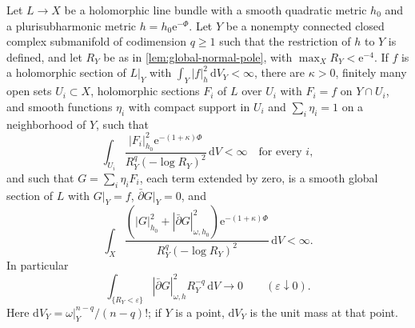 \begin{lemma}\label{lem:critical-gain-initial-gluing}
Let $L\to X$ be a holomorphic line bundle with a smooth quadratic metric $h_0$ and a plurisubharmonic metric $h=h_0\mathrm e^{-\Phi}$. Let $Y$ be a nonempty connected closed complex submanifold of codimension $q\geq1$ such that the restriction of $h$ to $Y$ is defined, and let $R_Y$ be as in \cref{lem:global-normal-pole}, with $\max_XR_Y<\mathrm e^{-4}$. If $f$ is a holomorphic section of $L|_Y$ with $\int_Y|f|_h^2\,\mathrm dV_Y<\infty$, there are $\kappa>0$, finitely many open sets $U_i\subset X$, holomorphic sections $F_i$ of $L$ over $U_i$ with $F_i=f$ on $Y\cap U_i$, and smooth functions $\eta_i$ with compact support in $U_i$ and $\sum_i\eta_i=1$ on a neighborhood of $Y$, such that
\begin{equation}\label{eq:critical-local-extension-gain}
 \int_{U_i}\frac{|F_i|_{h_0}^2\mathrm e^{-(1+\kappa)\Phi}}{R_Y^q(-\log R_Y)^2}\,\mathrm dV<\infty\quad\text{for every }i,
\end{equation}
and such that $G=\sum_i\eta_iF_i$, each term extended by zero, is a smooth global section of $L$ with $G|_Y=f$, $\bar\partial G|_Y=0$, and
\begin{equation}\label{eq:strengthened-critical-initial-norm}
 \int_X\frac{(|G|_{h_0}^2+|\bar\partial G|_{\omega,h_0}^2)
                         \mathrm e^{-(1+\kappa)\Phi}}
                    {R_Y^q(-\log R_Y)^2}\,\mathrm dV<\infty.
\end{equation}
In particular
\begin{equation}\label{eq:critical-gluing-error-decay}
 \int_{\{R_Y<\varepsilon\}}|\bar\partial G|_{\omega,h}^2R_Y^{-q}\,\mathrm dV
                  \longrightarrow0\qquad(\varepsilon\downarrow0).
\end{equation}
Here $\mathrm dV_Y=\omega|_Y^{n-q}/(n-q)!$; if $Y$ is a point, $\mathrm dV_Y$ is the unit mass at that point.
\end{lemma}
